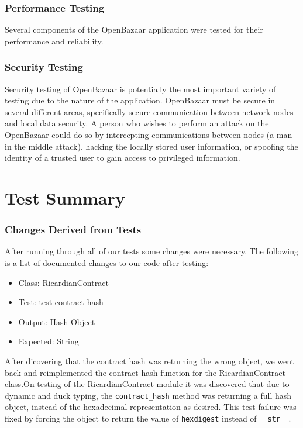 \documentclass{article}
\begin{document}
\section{Performance Testing}
Several components of the OpenBazaar application were tested for their performance and reliability. 

\section{Security Testing}
Security testing of OpenBazaar is potentially the most important variety of testing due to the nature of the application. OpenBazaar must be secure in several different areas, specifically secure communication between network nodes and local data security. A person who wishes to perform an attack on the OpenBazaar could do so by intercepting communications between nodes (a man in the middle attack), hacking the locally stored user information, or spoofing the identity of a trusted user to gain access to privileged information.
\part*{Test Summary}



\section{Changes Derived from Tests}
After running through all of our tests some changes were necessary. The following is a list of documented changes to our code after testing:
\newline
\begin{itemize}
\item Class: RicardianContract
\item Test: test contract hash
\item Output: Hash Object
\item Expected: String\newline
\end{itemize} 
After dicovering that the contract hash was returning the wrong object, we went back and reimplemented the contract hash function for the RicardianContract class.On testing of the RicardianContract module it was discovered that due to dynamic and duck typing, the \texttt{contract\_hash} method was returning a full hash object, instead of the hexadecimal representation as desired. This test failure was fixed by forcing the object to return the value of \texttt{hexdigest} instead of \texttt{\_\_str\_\_}.



\end{document}
